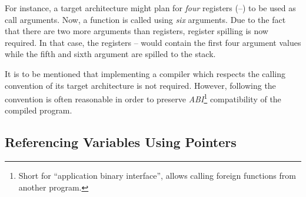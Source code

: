 For instance, a target architecture might plan for \emph{four} registers (--) to be used as call arguments.
Now, a function is called using \emph{six} arguments.
Due to the fact that there are two more arguments than registers, register spilling is now required.
In that case, the registers -- would contain the first four argument values while the fifth and sixth argument are spilled to the stack.
%

It is to be mentioned that implementing a compiler which respects the calling convention of its target architecture is not required.
However, following the convention is often reasonable in order to preserve \emph{ABI}\footnote{Short for \enquote{application binary interface}, allows calling foreign functions from another program.} compatibility of the compiled program.

\subsection{Referencing Variables Using Pointers}\label{sec:pointers}

